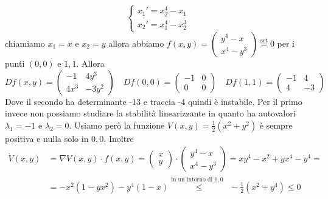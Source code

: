 \begin{example}
    \[
      \begin{cases}
          x_{1}' = x_{2}^{4} - x_{1} \\
          x_{2}' = x_{1}^{4} - x_{2}^{3}
      \end{cases}
    \]
    chiamiamo \(x_{1} = x\) e \(x_{2} = y\) allora abbiamo \(f{(x, y)} = \begin{pmatrix}
        y^{4}-x \\
        x^{4}-y^{3}
\end{pmatrix} \overset{\text{set}}{=} 0\) per i punti \((0, 0)\) e \(1, 1\).
Allora
\[
  Df{(x, y)} = \begin{pmatrix}
      -1 & 4y^{3} \\
      4x^{3} & -3y^{2}
  \end{pmatrix} \quad Df{(0, 0)} = \begin{pmatrix}
      -1 & 0 \\
      0 & 0
  \end{pmatrix} \quad Df{(1, 1)} = \begin{pmatrix}
      -1 & 4 \\
      4 & -3
  \end{pmatrix}
\]
Dove il secondo ha determinante -13 e traccia -4 quindi è instabile. Per il
primo invece non possiamo studiare la stabilità linearizzante in quanto ha
autovalori \(\lambda_{1} = -1\) e \(\lambda_{2} = 0\). Usiamo però la funzione
\(V{(x, y)} = \frac{1}{2}{(x^2 + y^2)}\) è sempre positiva e nulla solo in \(0,
0\). Inoltre
\begin{align*}
    \dot{V}{(x,y)} &= \nabla V{(x,y)} \cdot f{(x,y)} = \begin{pmatrix}
      x \\
      y
  \end{pmatrix} \cdot  \begin{pmatrix}
      y^{4} - x \\
      x^{4} - y^{3}
  \end{pmatrix} = xy^{4} - x^2 + yx^{4} - y^{4} = \\
                   &= -x^2{(1 - yx^2)} - y^{4}{(1 - x)} \overset{\text{in un intorno di \(0,0\) }}{\le } -\frac{1}{2}{(x^2 + y^{4})} \le 0
\end{align*}
\end{example}
